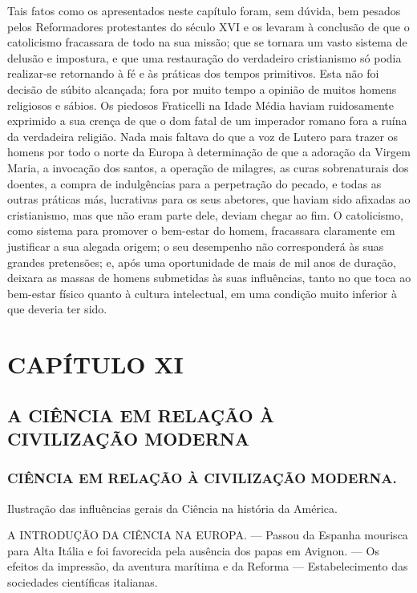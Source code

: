 \documentclass[11pt,a5paper,twoside,openany]{book}
\begin{document}
Tais fatos como os apresentados neste capítulo foram, sem dúvida, bem pesados pelos Reformadores protestantes do século XVI e os levaram à conclusão de que o catolicismo fracassara de todo na sua missão; que se tornara um vasto sistema de delusão e impostura, e que uma restauração do verdadeiro cristianismo só podia realizar-se retornando à fé e às práticas dos tempos primitivos. Esta não foi decisão de súbito alcançada; fora por muito tempo a opinião de muitos homens religiosos e sábios. Os piedosos Fraticelli na Idade Média haviam ruidosamente exprimido a sua crença de que o dom fatal de um imperador romano fora a ruína da verdadeira religião. Nada mais faltava do que a voz de Lutero para trazer os homens por todo o norte da Europa à determinação de que a adoração da Virgem Maria, a invocação dos santos, a operação de milagres, as curas sobrenaturais dos doentes, a compra de indulgências para a perpetração do pecado, e todas as outras práticas más, lucrativas para os seus abetores, que haviam sido afixadas ao cristianismo, mas que não eram parte dele, deviam chegar ao fim. O catolicismo, como sistema para promover o bem-estar do homem, fracassara claramente em justificar a sua alegada origem; o seu desempenho não corresponderá às suas grandes pretensões; e, após uma oportunidade de mais de mil anos de duração, deixara as massas de homens submetidas às suas influências, tanto no que toca ao bem-estar físico quanto à cultura intelectual, em uma condição muito inferior à que deveria ter sido.

\clearpage
\chapter*{CAPÍTULO XI}
\section*{A CIÊNCIA EM RELAÇÃO À CIVILIZAÇÃO MODERNA}
\subsection*{CIÊNCIA EM RELAÇÃO À CIVILIZAÇÃO MODERNA.}
Ilustração das influências gerais da Ciência na história da América.

A INTRODUÇÃO DA CIÊNCIA NA EUROPA. — Passou da Espanha mourisca para Alta Itália e foi favorecida pela ausência dos papas em Avignon. — Os efeitos da impressão, da aventura marítima e da Reforma — Estabelecimento das sociedades científicas italianas.
\end{document}
